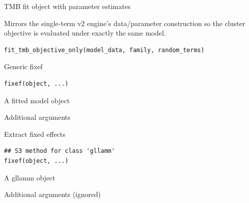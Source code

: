 \documentclass[a4paper]{book}
\begin{document}
%
\begin{Value}
TMB fit object with parameter estimates
\end{Value}
%
\begin{Description}
Mirrors the single-term v2 engine's data/parameter construction so the
cluster objective is evaluated under exactly the same model.
\end{Description}
%
\begin{Usage}
\begin{verbatim}
fit_tmb_objective_only(model_data, family, random_terms)
\end{verbatim}
\end{Usage}
%
\begin{Description}
Generic fixef
\end{Description}
%
\begin{Usage}
\begin{verbatim}
fixef(object, ...)
\end{verbatim}
\end{Usage}
%
\begin{Arguments}
\begin{ldescription}
\item[\code{object}] A fitted model object

\item[\code{...}] Additional arguments
\end{ldescription}
\end{Arguments}
%
\begin{Description}
Extract fixed effects
\end{Description}
%
\begin{Usage}
\begin{verbatim}
## S3 method for class 'gllamm'
fixef(object, ...)
\end{verbatim}
\end{Usage}
%
\begin{Arguments}
\begin{ldescription}
\item[\code{object}] A gllamm object

\item[\code{...}] Additional arguments (ignored)
\end{ldescription}
\end{Arguments}
\end{document}
